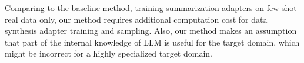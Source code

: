 Comparing to the baseline method, training summarization adapters on few shot real data only, our method requires additional computation cost for data synthesis adapter training and sampling.
Also, our method makes an assumption that part of the internal knowledge of LLM is useful for the target domain, which might be incorrect for a highly specialized target domain.


